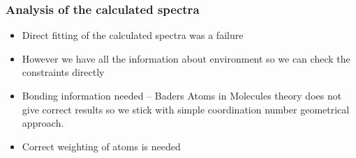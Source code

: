 \documentclass[noamsthm,8pt,t,xcolor={dvipsnames}]{beamer}
\begin{document}
\begin{frame}
   \frametitle{Analysis of the calculated spectra}
   \vspace{-0.3cm}
   \begin{itemize}
      \item Direct fitting of the calculated spectra was a failure
      \item However we have all the information about environment so we can check the constraints directly
      \item Bonding information needed -- Baders Atoms in Molecules theory does not give correct results so we stick with simple coordination number geometrical approach.
      \item Correct weighting of atoms is needed
   \end{itemize}
   \begin{center}
   \end{center}
\end{frame}
\end{document}
